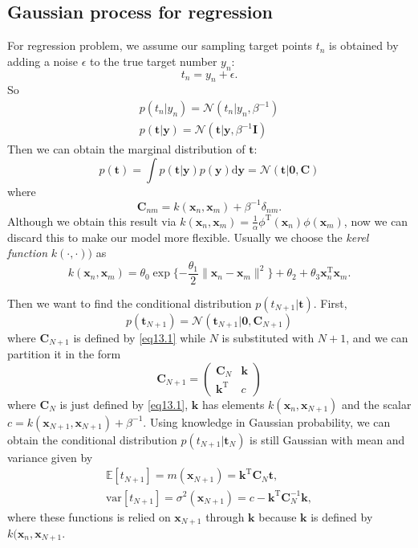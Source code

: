 \documentclass{article}
\newcommand{\normD}{\mathcal{N}}
\newcommand{\mrm}{\mathrm}
\newcommand{\mbf}{\mathbf}
\newcommand{\ud}{\mathrm{d}}
\newcommand{\CC}{\mbf C}
\newcommand{\kk}{\mbf k}
\newcommand{\ttt}{\mbf t}
\newcommand{\xx}{\mbf x}
\newcommand{\yy}{\mbf y}
\newcommand{\bmz}{\bm{0}}
\newcommand{\Exp}{\mathbb{E}}
\newcommand{\rev}{^{-1}}
\newcommand{\trans}{^{\mrm T}}
\begin{document}
\subsection{Gaussian process for regression}
For regression problem, we assume our sampling target points $t_n$ is obtained by adding a noise $\epsilon$ to the true target number $y_n$:
\begin{equation}
    t_n=y_n+\epsilon.
\end{equation}
So 
\begin{gather}
    p(t_n|y_n)=\normD(t_n|y_n, \beta\rev) \\
    p(\ttt|\yy) = \normD(\ttt|\yy,\beta\rev\mbf I)
\end{gather}
Then we can obtain the marginal distribution of $\ttt$:
\begin{equation}
    p(\ttt) = \int p(\ttt|\yy)p(\yy)\ud\yy=\normD(\ttt|\bmz, \CC)
\end{equation}
where 
\begin{equation}\label{eq13.1}
    \CC_{nm}=k(\xx_n,\xx_m)+\beta\rev\delta_{nm}.
\end{equation}
Although we obtain this result via $k(\xx_n,\xx_m) = \frac1\alpha\phi\trans(\xx_n)\phi(\xx_m)$, now we can discard this to make our model more flexible. Usually we choose the \emph{kerel function} $k(\cdot,\cdot))$ as 
\begin{equation}
    k(\xx_n,\xx_m)=\theta_0\exp\{-\frac{\theta_1}{2}\|\xx_n-\xx_m\|^2\}+\theta_2+\theta_3\xx_n\trans\xx_m.
\end{equation}

Then we want to find the conditional distribution $p(t_{N+1}|\ttt)$. First,
\begin{equation}
    p(\ttt_{N+1}) = \normD(\ttt_{N+1}|\bmz, \CC_{N+1})
\end{equation}
where $\CC_{N+1}$ is defined by \ref{eq13.1} while $N$ is substituted with $N+1$, and we can partition it in the form
\begin{equation}
    \CC_{N+1}=\left(\begin{array}{cc}
         \CC_N & \kk  \\
         \kk\trans & c 
    \end{array}\right)
\end{equation}
where $\CC_N$ is just defined by \ref{eq13.1}, $\kk$ has elements $k(\xx_n,\xx_{N+1})$ and the scalar $c = k(\xx_{N+1},\xx_{N+1})+\beta\rev$.
Using knowledge in Gaussian probability, we can obtain the conditional distribution $p(t_{N+1}|\ttt_N)$ is still Gaussian with mean and variance given by 
\begin{gather}\label{eq13.2}
    \Exp[t_{N+1}] = m(\xx_{N+1})=\kk\trans\CC_N\ttt, \\
    \mrm{var}[t_{N+1}] = \sigma^2(\xx_{N+1})=c-\kk\trans\CC_N\rev\kk,
\end{gather}
where these functions is relied on $\xx_{N+1}$ through $\kk$ because $\kk$ is defined by $k(\xx_n,\xx_{N+1}$.
\end{document}
